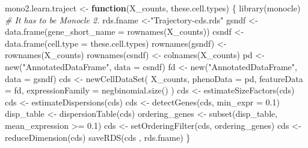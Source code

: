 \documentclass[
]{book}
\newenvironment{Shaded}{\begin{snugshade}}{\end{snugshade}}
\newcommand{\AttributeTok}[1]{\textcolor[rgb]{0.77,0.63,0.00}{#1}}
\newcommand{\CommentTok}[1]{\textcolor[rgb]{0.56,0.35,0.01}{\textit{#1}}}
\newcommand{\ControlFlowTok}[1]{\textcolor[rgb]{0.13,0.29,0.53}{\textbf{#1}}}
\newcommand{\FloatTok}[1]{\textcolor[rgb]{0.00,0.00,0.81}{#1}}
\newcommand{\FunctionTok}[1]{\textcolor[rgb]{0.00,0.00,0.00}{#1}}
\newcommand{\NormalTok}[1]{#1}
\newcommand{\OtherTok}[1]{\textcolor[rgb]{0.56,0.35,0.01}{#1}}
\newcommand{\SpecialCharTok}[1]{\textcolor[rgb]{0.00,0.00,0.00}{#1}}
\newcommand{\StringTok}[1]{\textcolor[rgb]{0.31,0.60,0.02}{#1}}
\begin{document}
\begin{Shaded}
\begin{Highlighting}[]
\NormalTok{mono2.learn.traject }\OtherTok{\textless{}{-}}
  \ControlFlowTok{function}\NormalTok{(X\_counts,}
\NormalTok{           these.cell.types) \{}
    \FunctionTok{library}\NormalTok{(monocle) }\CommentTok{\# It has to be Monocle 2.}
\NormalTok{    rds.fname }\OtherTok{\textless{}{-}}\StringTok{"Trajectory{-}cds.rds"}
\NormalTok{    gsndf }\OtherTok{\textless{}{-}} \FunctionTok{data.frame}\NormalTok{(}\AttributeTok{gene\_short\_name =} \FunctionTok{rownames}\NormalTok{(X\_counts))}
\NormalTok{    csndf }\OtherTok{\textless{}{-}} \FunctionTok{data.frame}\NormalTok{(}\AttributeTok{cell.type =}\NormalTok{ these.cell.types)}
    \FunctionTok{rownames}\NormalTok{(gsndf) }\OtherTok{\textless{}{-}} \FunctionTok{rownames}\NormalTok{(X\_counts)}
    \FunctionTok{rownames}\NormalTok{(csndf) }\OtherTok{\textless{}{-}} \FunctionTok{colnames}\NormalTok{(X\_counts)}
\NormalTok{    pd }\OtherTok{\textless{}{-}} \FunctionTok{new}\NormalTok{(}\StringTok{"AnnotatedDataFrame"}\NormalTok{, }\AttributeTok{data =}\NormalTok{ csndf)}
\NormalTok{    fd }\OtherTok{\textless{}{-}} \FunctionTok{new}\NormalTok{(}\StringTok{"AnnotatedDataFrame"}\NormalTok{, }\AttributeTok{data =}\NormalTok{ gsndf)}
\NormalTok{    cds }\OtherTok{\textless{}{-}}
      \FunctionTok{newCellDataSet}\NormalTok{(}
\NormalTok{        X\_counts,}
        \AttributeTok{phenoData =}\NormalTok{ pd,}
        \AttributeTok{featureData =}\NormalTok{ fd,}
        \AttributeTok{expressionFamily =} \FunctionTok{negbinomial.size}\NormalTok{()}
\NormalTok{      )}
\NormalTok{    cds }\OtherTok{\textless{}{-}} \FunctionTok{estimateSizeFactors}\NormalTok{(cds)}
\NormalTok{    cds }\OtherTok{\textless{}{-}} \FunctionTok{estimateDispersions}\NormalTok{(cds)}
\NormalTok{    cds }\OtherTok{\textless{}{-}} \FunctionTok{detectGenes}\NormalTok{(cds, }\AttributeTok{min\_expr =} \FloatTok{0.1}\NormalTok{)}
\NormalTok{    disp\_table }\OtherTok{\textless{}{-}} \FunctionTok{dispersionTable}\NormalTok{(cds)}
\NormalTok{    ordering\_genes }\OtherTok{\textless{}{-}} \FunctionTok{subset}\NormalTok{(disp\_table, mean\_expression }\SpecialCharTok{\textgreater{}=} \FloatTok{0.1}\NormalTok{)}
\NormalTok{    cds }\OtherTok{\textless{}{-}} \FunctionTok{setOrderingFilter}\NormalTok{(cds, ordering\_genes)}
\NormalTok{    cds }\OtherTok{\textless{}{-}} \FunctionTok{reduceDimension}\NormalTok{(cds)}
    \FunctionTok{saveRDS}\NormalTok{(cds , rds.fname)}
\NormalTok{\}}
\end{Highlighting}
\end{Shaded}
\end{document}
